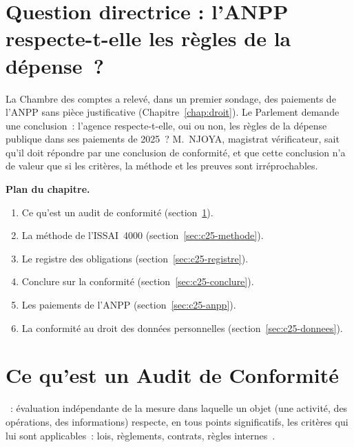 \bigskip

\section*{Question directrice : l'ANPP respecte-t-elle les règles de la dépense~?}

La Chambre des comptes a relevé, dans un premier sondage, des paiements de
l'ANPP sans pièce justificative (Chapitre~\ref{chap:droit}). Le Parlement
demande une conclusion~: l'agence respecte-t-elle, oui ou non, les règles
de la dépense publique dans ses paiements de 2025~? M.~NJOYA, magistrat
vérificateur, sait qu'il doit répondre par une conclusion de conformité, et
que cette conclusion n'a de valeur que si les critères, la méthode et les
preuves sont irréprochables.

\medskip
\textbf{Plan du chapitre.}
\begin{enumerate}
    \item Ce qu'est un audit de conformité (section~\ref{sec:c25-definition}).
    \item La méthode de l'ISSAI~4000 (section~\ref{sec:c25-methode}).
    \item Le registre des obligations (section~\ref{sec:c25-registre}).
    \item Conclure sur la conformité (section~\ref{sec:c25-conclure}).
    \item Les paiements de l'ANPP (section~\ref{sec:c25-anpp}).
    \item La conformité au droit des données personnelles
          (section~\ref{sec:c25-donnees}).
\end{enumerate}

\separateur

\section{Ce qu'est un Audit de Conformité}
\label{sec:c25-definition}

\begin{boxdef}
~: évaluation
indépendante de la mesure dans laquelle un objet (une activité, des
opérations, des informations) respecte, en tous points significatifs, les
critères qui lui sont applicables~: lois, règlements, contrats, règles
internes~\cite{idi2021conformite}.
\end{boxdef}


